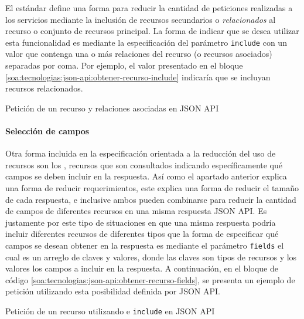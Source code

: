 El estándar define una forma para reducir la cantidad de peticiones realizadas a los servicios mediante la inclusión de recursos secundarios o \textit{relacionados} al recurso o conjunto de recursos principal. La forma de indicar que se desea utilizar esta funcionalidad es mediante la especificación del parámetro \texttt{include} con un valor que contenga una o más relaciones del recurso (o recursos asociados) separadas por coma. Por ejemplo, el valor presentado en el bloque \autoref{soa:tecnologias:json-api:obtener-recurso-include} indicaría que se incluyan recursos relacionados.

\begin{listing}
  \caption{Petición de un recurso y relaciones asociadas en JSON API}
  \label{soa:tecnologias:json-api:obtener-recurso-include}
\end{listing}

\paragraph{Selección de campos}

Otra forma incluida en la especificación orientada a la reducción del uso de recursos son los , recursos que son consultados indicando específicamente qué campos se deben incluir en la respuesta. Así como el apartado anterior explica una forma de reducir requerimientos, este explica una forma de reducir el tamaño de cada respuesta, e inclusive ambos pueden combinarse para reducir la cantidad de campos de diferentes recursos en una misma respuesta JSON API. Es justamente por este tipo de situaciones en que una misma respuesta podría incluir diferentes recursos de diferentes tipos que la forma de especificar qué campos se desean obtener en la respuesta es mediante el parámetro \texttt{fields} el cual es un arreglo de claves y valores, donde las claves son tipos de recursos y los valores los campos a incluir en la respuesta. A continuación, en el bloque de código \autoref{soa:tecnologias:json-api:obtener-recurso-fields}, se presenta un ejemplo de petición utilizando esta posibilidad definida por JSON API.

\begin{listing}
  \caption{Petición de un recurso utilizando  e \texttt{include} en JSON API}
  \label{soa:tecnologias:json-api:obtener-recurso-fields}
\end{listing}

